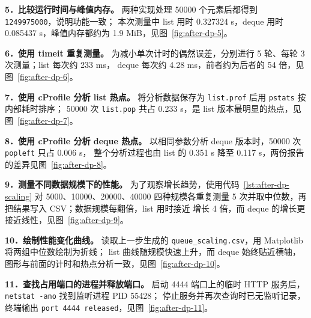 \documentclass[12pt,a4paper,fontset=fandol]{ctexart}
\begin{document}
\noindent\textbf{5．比较运行时间与峰值内存。}
两种实现处理 50000 个元素后都得到 \texttt{1249975000}，说明功能一致；
本次测量中 list 用时 0.327324 s，deque 用时 0.085437 s，峰值内存都约为 1.9 MiB，见图~\ref{fig:after-dp-5}。

\noindent\textbf{6．使用 timeit 重复测量。}
为减小单次计时的偶然误差，分别进行 5 轮、每轮 3 次测量；list 每次约 233 ms，
deque 每次约 4.28 ms，前者约为后者的 54 倍，见图~\ref{fig:after-dp-6}。

\noindent\textbf{7．使用 cProfile 分析 list 热点。}
将分析数据保存为 \texttt{list.prof} 后用 \texttt{pstats} 按内部耗时排序；
50000 次 \texttt{list.pop} 共占 0.233 s，是 list 版本最明显的热点，见图~\ref{fig:after-dp-7}。

\noindent\textbf{8．使用 cProfile 分析 deque 热点。}
以相同参数分析 deque 版本时，50000 次 \texttt{popleft} 只占 0.006 s，
整个分析过程也由 list 的 0.351 s 降至 0.117 s，两份报告的差异见图~\ref{fig:after-dp-8}。

\noindent\textbf{9．测量不同数据规模下的性能。}
为了观察增长趋势，使用代码~\ref{lst:after-dp-scaling} 对 5000、10000、20000、40000
四种规模各重复测量 5 次并取中位数，再把结果写入 CSV；数据规模每翻倍，list 用时接近
增长 4 倍，而 deque 的增长更接近线性，见图~\ref{fig:after-dp-9}。




\noindent\textbf{10．绘制性能变化曲线。}
读取上一步生成的 \texttt{queue\_scaling.csv}，用 Matplotlib 将两组中位数绘制为折线；
list 曲线随规模快速上升，而 deque 始终贴近横轴，图形与前面的计时和热点分析一致，见图~\ref{fig:after-dp-10}。

\noindent\textbf{11．查找占用端口的进程并释放端口。}
启动 4444 端口上的临时 HTTP 服务后，\texttt{netstat -ano} 找到监听进程 PID 55428；
停止服务并再次查询时已无监听记录，终端输出 \texttt{port 4444 released}，见图~\ref{fig:after-dp-11}。
\end{document}
